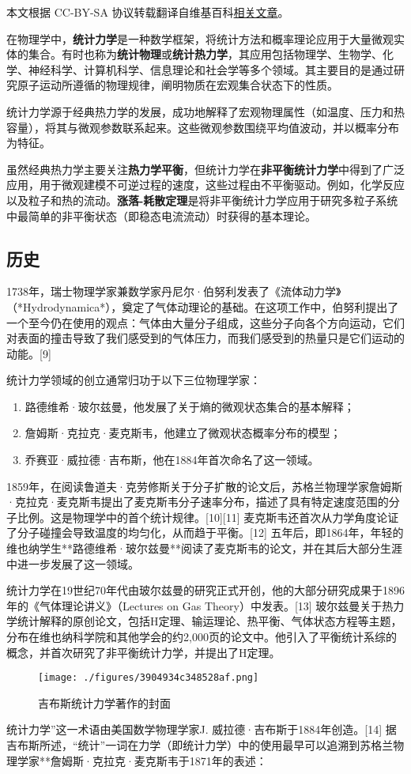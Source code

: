 
本文根据 CC-BY-SA 协议转载翻译自维基百科\href{https://en.wikipedia.org/wiki/Statistical_mechanics}{相关文章}。

在物理学中，\textbf{统计力学}是一种数学框架，将统计方法和概率理论应用于大量微观实体的集合。有时也称为\textbf{统计物理}或\textbf{统计热力学}，其应用包括物理学、生物学、化学、神经科学、计算机科学、信息理论和社会学等多个领域。其主要目的是通过研究原子运动所遵循的物理规律，阐明物质在宏观集合状态下的性质。

统计力学源于经典热力学的发展，成功地解释了宏观物理属性（如温度、压力和热容量），将其与微观参数联系起来。这些微观参数围绕平均值波动，并以概率分布为特征。

虽然经典热力学主要关注\textbf{热力学平衡}，但统计力学在\textbf{非平衡统计力学}中得到了广泛应用，用于微观建模不可逆过程的速度，这些过程由不平衡驱动。例如，化学反应以及粒子和热的流动。\textbf{涨落-耗散定理}是将非平衡统计力学应用于研究多粒子系统中最简单的非平衡状态（即稳态电流流动）时获得的基本理论。
\subsection{历史}
1738年，瑞士物理学家兼数学家丹尼尔·伯努利发表了《流体动力学》（*Hydrodynamica*），奠定了气体动理论的基础。在这项工作中，伯努利提出了一个至今仍在使用的观点：气体由大量分子组成，这些分子向各个方向运动，它们对表面的撞击导致了我们感受到的气体压力，而我们感受到的热量只是它们运动的动能。[9]

统计力学领域的创立通常归功于以下三位物理学家：
\begin{enumerate}
\item 路德维希·玻尔兹曼，他发展了关于熵的微观状态集合的基本解释；
\item 詹姆斯·克拉克·麦克斯韦，他建立了微观状态概率分布的模型；
\item 乔赛亚·威拉德·吉布斯，他在1884年首次命名了这一领域。
\end{enumerate}

1859年，在阅读鲁道夫·克劳修斯关于分子扩散的论文后，苏格兰物理学家詹姆斯·克拉克·麦克斯韦提出了麦克斯韦分子速率分布，描述了具有特定速度范围的分子比例。这是物理学中的首个统计规律。[10][11] 麦克斯韦还首次从力学角度论证了分子碰撞会导致温度的均匀化，从而趋于平衡。[12] 五年后，即1864年，年轻的维也纳学生**路德维希·玻尔兹曼**阅读了麦克斯韦的论文，并在其后大部分生涯中进一步发展了这一领域。

统计力学在19世纪70年代由玻尔兹曼的研究正式开创，他的大部分研究成果于1896年的《气体理论讲义》（Lectures on Gas Theory）中发表。[13] 玻尔兹曼关于热力学统计解释的原创论文，包括H定理、输运理论、热平衡、气体状态方程等主题，分布在维也纳科学院和其他学会的约2,000页的论文中。他引入了平衡统计系综的概念，并首次研究了非平衡统计力学，并提出了H定理。
\begin{figure}[ht]
\centering
\texttt{[image: ./figures/3904934c348528af.png]}
\caption{吉布斯统计力学著作的封面} \label{fig_TJLX_1}
\end{figure}
统计力学”这一术语由美国数学物理学家J. 威拉德·吉布斯于1884年创造。[14] 据吉布斯所述，“统计”一词在力学（即统计力学）中的使用最早可以追溯到苏格兰物理学家**詹姆斯·克拉克·麦克斯韦于1871年的表述：

